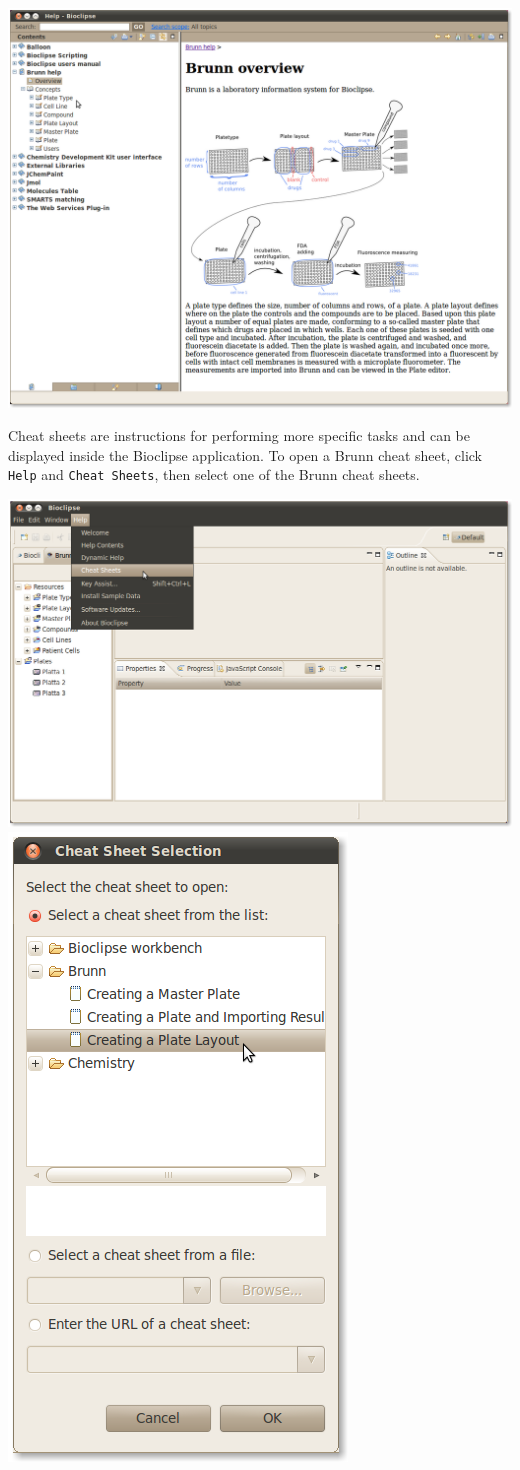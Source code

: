\documentclass[12pt, a4paper, twoside, openany]{article}
\begin{document}
    \begin{center}
        \includegraphics[scale=1.2]{images/6.png}
    \end{center}

    \newpage

    Cheat sheets are instructions for performing more specific tasks and can be
    displayed inside the Bioclipse application. To open a Brunn cheat sheet,
    click \texttt{Help} and \texttt{Cheat Sheets}, then select one of the Brunn
    cheat sheets.

    \begin{center}
        \includegraphics[height=35ex]{images/3.png}
        \hfill
        \includegraphics[height=35ex]{images/4.png}
    \end{center}
\end{document}
